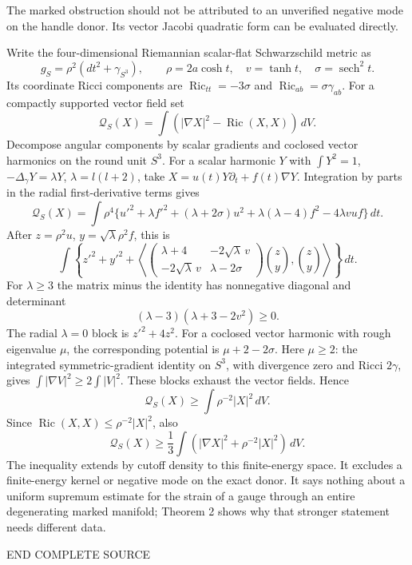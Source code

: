 \documentclass[
  10pt,
]{article}
\begin{document}
The marked obstruction should not be attributed to an unverified
negative mode on the handle donor. Its vector Jacobi quadratic form can
be evaluated directly.

Write the four-dimensional Riemannian scalar-flat Schwarzschild metric
as \[
 g_S=\rho^2(dt^2+\gamma_{S^3}),\qquad
 \rho=2a\cosh t,\quad v=\tanh t,\quad \sigma=\operatorname{sech}^2t .
\] Its coordinate Ricci components are
\(\operatorname{Ric}_{tt}=-3\sigma\) and
\(\operatorname{Ric}_{ab}=\sigma\gamma_{ab}\). For a compactly supported
vector field set \[
 \mathcal Q_S(X)=\int
       (|\nabla X|^2-\operatorname{Ric}(X,X))\,dV .
\] Decompose angular components by scalar gradients and coclosed vector
harmonics on the round unit \(S^3\). For a scalar harmonic \(Y\) with
\(\int Y^2=1\), \(-\Delta_\gamma Y=\lambda Y\), \(\lambda=l(l+2)\), take
\(X=u(t)Y\partial_t+f(t)\nabla Y\). Integration by parts in the radial
first-derivative terms gives \[
 \mathcal Q_S(X)=\int\rho^4\{
 u'^2+\lambda f'^2+(\lambda+2\sigma)u^2
       +\lambda(\lambda-4)f^2-4\lambda vuf\}\,dt .
\] After \(z=\rho^2u\), \(y=\sqrt{\lambda}\rho^2f\), this is \[
 \int\left\{z'^2+y'^2+
 \left\langle
 \begin{pmatrix}
 \lambda+4&-2\sqrt{\lambda}\,v\\
 -2\sqrt{\lambda}\,v&\lambda-2\sigma
 \end{pmatrix}
 \binom zy,\binom zy\right\rangle\right\}\,dt .          \tag{A.1}
\] For \(\lambda\ge3\) the matrix minus the identity has nonnegative
diagonal and determinant \[
       (\lambda-3)(\lambda+3-2v^2)\ge0 .
\] The radial \(\lambda=0\) block is \(z'^2+4z^2\). For a coclosed
vector harmonic with rough eigenvalue \(\mu\), the corresponding
potential is \(\mu+2-2\sigma\). Here \(\mu\ge2\): the integrated
symmetric-gradient identity on \(S^3\), with divergence zero and Ricci
\(2\gamma\), gives \(\int|\nabla V|^2\ge2\int|V|^2\). These blocks
exhaust the vector fields. Hence \[
 \mathcal Q_S(X)\ge\int\rho^{-2}|X|^2\,dV .             \tag{A.2}
\] Since \(\operatorname{Ric}(X,X)\le\rho^{-2}|X|^2\), also \[
 \mathcal Q_S(X)\ge\frac13
       \int(|\nabla X|^2+\rho^{-2}|X|^2)\,dV .         \tag{A.3}
\] The inequality extends by cutoff density to this finite-energy space.
It excludes a finite-energy kernel or negative mode on the exact donor.
It says nothing about a uniform supremum estimate for the strain of a
gauge through an entire degenerating marked manifold; Theorem 2 shows
why that stronger statement needs different data.

END COMPLETE SOURCE
\end{document}

